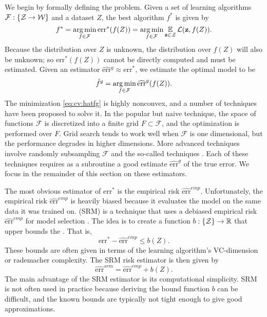 \documentclass[thesis.tex]{subfiles}
\newcommand{\set}[1]{\mathcal {#1}}
\newcommand{\riskstar}{{\textrm{err}^*}}
\newcommand{\riskhat}{\widehat{\textrm{err}}}
\newcommand{\riskemp}{\widehat{\textrm{err}}^\textit{emp}}
\newcommand{\risksrm}{\widehat{\textrm{err}}^\textit{srm}}
\begin{document}
We begin by formally defining the  problem.
Given a set of learning algorithms $\set F : \{\Z \to \W\}$ and a dataset $Z$,
the best algorithm $f^*$ is given by
\begin{equation}
    f^*
    = \argmin_{f\in\set F} \riskstar(f(Z))
    = \argmin_{f\in\set F} \E_{\z\in\Z}\Loss(\z,f(Z))
    .
\end{equation}
Because the distribution over $Z$ is unknown, 
the distribution over $f(Z)$ will also be unknown;
so $\riskstar(f(Z))$ cannot be directly computed and must be estimated.
Given an estimator $\riskhat{}^g \approx \riskstar$,
we estimate the optimal model to be
\begin{equation}
    \label{eq:cv:hatfg}
    \hat f^g = \argmin_{f\in\set F} \riskhat^g(f(Z))
    .
\end{equation}
The minimization \eqref{eq:cv:hatfg} is highly nonconvex,
and a number of techniques have been proposed to solve it.
In the popular but naive  technique,
the space of functions $\set F$ is discretized into a finite grid $F\subset\set F$,
and the optimization is performed over $F$.
Grid search tends to work well when $\set F$ is one dimensional,
but the performance degrades in higher dimensions.
More advanced techniques involve randomly subsampling $\set F$ \citep{bergstra2012random} and the so-called  techniques \citep[e.g.][]{snoek2012practical,feurer2015efficient}.
Each of these techniques requires as a subroutine a good estimate $\riskhat^g$ of the true error.
We focus in the remainder of this section on these estimators.

The most obvious estimator of $\riskstar$ is the empirical risk $\riskemp$.
Unfortunately, the empirical risk $\riskemp$ is heavily biased because it evaluates the model on the same data it was trained on.
 (SRM) is a technique that uses a debiased empirical risk $\riskemp$ for model selection
\citep[Chapter 7 of ][]{shalev2014understanding}.
The idea is to create a function $b : \{{\mathcal Z}\} \to \mathbb R$ that upper bounds the .
That is,
\begin{equation}
    \riskstar-    \riskemp\le b(Z)
    .
\end{equation}
These bounds are often given in terms of the learning algorithm's VC-dimension or rademacher complexity.
The SRM risk estimator is then given by
\begin{equation}
    \risksrm 
    = \riskemp + b(Z) 
    .
\end{equation}
The main advantage of the SRM estimator is its computational simplicity.
SRM is not often used in practice because deriving the bound function $b$ can be difficult,
and the known bounds are typically not tight enough to give good approximations.
\end{document}
